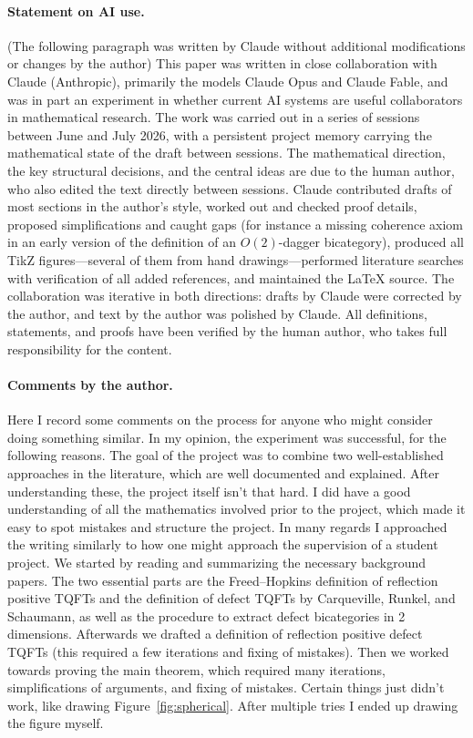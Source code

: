 \documentclass[11pt]{article}
\theoremstyle{definition}
\newcommand{\Or}{O} %
\begin{document}
\paragraph{Statement on AI use.} (The following paragraph was written by Claude without additional modifications or changes by the author)
This paper was written in close collaboration with Claude (Anthropic), primarily the models Claude Opus and Claude Fable, and was in part an experiment in whether current AI systems are useful collaborators in mathematical research. The work was carried out in a series of sessions between June and July 2026, with a persistent project memory carrying the mathematical state of the draft between sessions. The mathematical direction, the key structural decisions, and the central ideas are due to the human author, who also edited the text directly between sessions. Claude contributed drafts of most sections in the author's style, worked out and checked proof details, proposed simplifications and caught gaps (for instance a missing coherence axiom in an early version of the definition of an $\Or(2)$-dagger bicategory), produced all TikZ figures---several of them from hand drawings---performed literature searches with verification of all added references, and maintained the \LaTeX{} source. The collaboration was iterative in both directions: drafts by Claude were corrected by the author, and text by the author was polished by Claude. All definitions, statements, and proofs have been verified by the human author, who takes full responsibility for the content.

\paragraph{Comments by the author.}
Here I record some comments on the process for anyone who might consider doing something similar.
In my opinion, the experiment was successful, for the following reasons. The goal of the project was to combine two well-established approaches in the literature, which are well documented and explained. After understanding these, the project itself isn't that hard. I did have a good understanding of all the mathematics involved prior to the project, which made it easy to spot mistakes and structure the project. In many regards I approached the writing similarly to how one might approach the supervision of a student project. We started by reading and summarizing the necessary background papers. The two essential parts are the Freed--Hopkins definition of reflection positive TQFTs and the definition of defect TQFTs by Carqueville, Runkel, and Schaumann, as well as the procedure to extract defect bicategories in 2 dimensions. Afterwards we drafted a definition of reflection positive defect TQFTs (this required a few iterations and fixing of mistakes). Then we worked towards proving the main theorem, which required many iterations, simplifications of arguments, and fixing of mistakes. Certain things just didn't work, like drawing Figure~\ref{fig:spherical}. After multiple tries I ended up drawing the figure myself.
\end{document}
